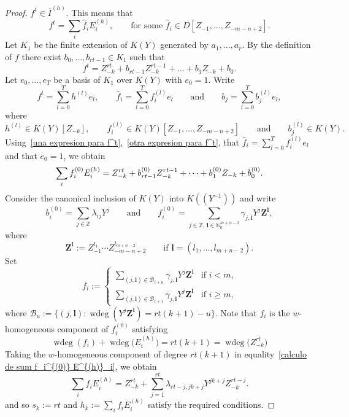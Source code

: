 \documentclass[reqno,a4paper]{amsart}
\theoremstyle{definition}
\theoremstyle{remark}
\DeclareMathOperator{\wdeg}{wdeg}
\newcommand{\ov}{\overline}
\begin{document}
\begin{proof}
$f^t\in \ov I^{(h)}$. This means that
\begin{equation}\label{una expresion para f^t}
f^t = \sum_i \hat{f}_i E^{(h)}_i,\qquad\text{for some $\hat{f}_i\in D[Z_{-1},\dots,Z_{-m-n+2}]$.}
\end{equation}
Let $K_1$ be the finite extension of $K(Y)$ generated by $a_1,\dots,a_r$. By the
definition of $f$ there exist $b_0,\dots,b_{rt-1}\in K_1$ such that
\begin{equation}\label{otra expresion para f^t}
f^t =  Z_{-k}^{rt}+b_{rt-1}Z_{-k}^{rt-1}+\dots+b_1 Z_{-k}+ b_0.
\end{equation}
Let $e_0,\dots,e_T$ be a basis of $K_1$ over $K(Y)$ with $e_0=1$. Write
$$
f^t = \sum_{l=0}^T h^{(l)} e_l ,\qquad \hat{f}_i = \sum_{l=0}^T f_i^{(l)} e_l\qquad
\text{and}\qquad b_j = \sum_{l=0}^T b_j^{(l)} e_l,
$$
where
$$
h^{(l)}\in K(Y)[Z_{-k}],\qquad f_i^{(l)}\in K(Y)[Z_{-1},\dots,Z_{-m-n+2}]\qquad\text{and}
\qquad b_j^{(l)}\in K(Y).
$$
Using~\eqref{una expresion para f^t},~\eqref{otra expresion para f^t}, that $\hat{f}_i =
\sum_{l=0}^T f_i^{(l)}e_l$ and that $e_0=1$, we obtain
\begin{equation}\label{calculo de sum f_i^{(0)} E^{(h)}_i} \sum_i f_i^{(0)} E^{(h)}_i =
Z_{-k}^{rt}+b_{rt-1}^{(0)}Z_{-k}^{rt-1}+\dots+b_1^{(0)} Z_{-k}+ b_0^{(0)}.
\end{equation}
Consider the canonical inclusion of $K(Y)$ into $K((Y^{-1}))$ and write
$$
b_i^{(0)} = \sum_{j\in \mathds{Z}} \lambda_{ij} Y^j\qquad\text{and}\qquad f_i^{(0)} = \sum_{j\in
\mathds{Z},\,\mathbf{l}\in \mathds{N}_0^{m+n-2}} \gamma_{j,\mathbf{l}} Y^j \mathbf{Z}^{\mathbf{l}},
$$
where
$$
\mathbf{Z}^{\mathbf{l}} := Z_{-1}^{l_1}\cdots Z_{-m-n+2}^{l_{m+n-2}}\qquad\text{if $\mathbf{l} =
(l_1,\dots,l_{m+n-2})$}.
$$
Set
$$
f_i := \begin{cases} \displaystyle{\sum_{(j,\mathbf{l})\in \mathcal{B}_{i+n}} \gamma_{j,\mathbf{l}} Y^j
\mathbf{Z}^{\mathbf{l}}} & \text{if $i<m$,}\\[13pt] \displaystyle{\sum_{(j,\mathbf{l})\in \mathcal{B}_{i+1}}
\gamma_{j,\mathbf{l}} Y^j \mathbf{Z}^{\mathbf{l}}} & \text{if $i\ge m$,}
\end{cases}
$$
where $\mathcal{B}_u:=\{(j,\mathbf{l}): \wdeg(Y^j \mathbf{Z}^{\mathbf{l}}) = rt(k+1)-u\}$. Note that $f_i$ is
the $w$-ho\-mo\-geneous component of $f_i^{(0)}$ satisfying
$$
\wdeg(f_i) + \wdeg\bigl(E_i^{(h)}\bigr)= rt(k+1) = \wdeg\bigl(Z_{-k}^{rt}\bigr)
$$
Taking the $w$-homogeneous component of degree $rt(k+1)$ in
equality~\eqref{calculo de sum f_i^{(0)} E^{(h)}_i}, we obtain
$$
\sum_i f_i E^{(h)}_i = Z_{-k}^{rt} + \sum_{j=1}^{rt} \lambda_{rt-j,jk+j} Y^{jk+j}  Z_{-k}^{rt-j}.
$$
and so $s_k:=rt$ and $h_k:=\sum_i f_i E^{(h)}_i$ satisfy the required conditions.
\end{proof}
\end{document}
